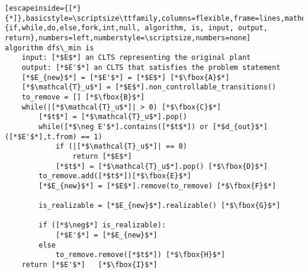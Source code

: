 \renewcommand{\ttdefault}{pcr}
\begin{lstlisting}[escapeinside={[*}{*]},basicstyle=\scriptsize\ttfamily,columns=flexible,frame=lines,mathescape=true,keywordstyle=\textbf,morekeywords={if,while,do,else,fork,int,null, algorithm, is, input, output, return},numbers=left,numberstyle=\scriptsize,numbers=none]
algorithm dfs\_min is
	input: [*$E$*] an CLTS representing the original plant
	output: [*$E'$*] an CLTS that satisfies the problem statement
	[*$E_{new}$*] = [*$E'$*] = [*$E$*] [*$\fbox{A}$*]
	[*$\mathcal{T}_u$*] = [*$E$*].non_controllable_transitions()
	to_remove = [] [*$\fbox{B}$*]
	while(|[*$\mathcal{T}_u$*]| > 0) [*$\fbox{C}$*]
		[*$t$*] = [*$\mathcal{T}_u$*].pop()
		while([*$\neg E'$*].contains([*$t$*]) or [*$d_{out}$*]([*$E'$*],t.from) == 1)
			if (|[*$\mathcal{T}_u$*]| == 0)
				return [*$E$*]
			[*$t$*] = [*$\mathcal{T}_u$*].pop() [*$\fbox{D}$*]
		to_remove.add([*$t$*])[*$\fbox{E}$*]
		[*$E_{new}$*] = [*$E$*].remove(to_remove) [*$\fbox{F}$*]
		
		is_realizable = [*$E_{new}$*].realizable() [*$\fbox{G}$*]
		
		if ([*$\neg$*] is_realizable):
			[*$E'$*] = [*$E_{new}$*]
		else
			to_remove.remove([*$t$*]) [*$\fbox{H}$*]
	return [*$E'$*]   [*$\fbox{I}$*]
\end{lstlisting}